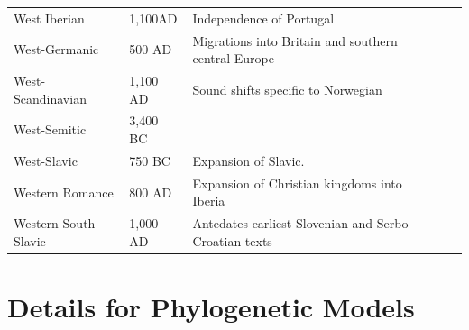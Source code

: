 \documentclass[11pt,a4paper]{article}
\begin{document}
\begin{longtable}{llp{10cm}lll}
West Iberian & 1,100AD & Independence of Portugal \\
West-Germanic & 500 AD & Migrations into Britain and southern central Europe\\
West-Scandinavian & 1,100 AD & Sound shifts specific to Norwegian\\
West-Semitic & 3,400 BC & \citep{kitchen2009bayesian}  \\
West-Slavic & 750 BC & Expansion of Slavic. \\ %
Western Romance & 800 AD & Expansion of Christian kingdoms into Iberia \\
Western South Slavic & 1,000 AD & Antedates earliest Slovenian and Serbo-Croatian texts\\
\end{longtable}





\section{Details for Phylogenetic Models}








\end{document}
